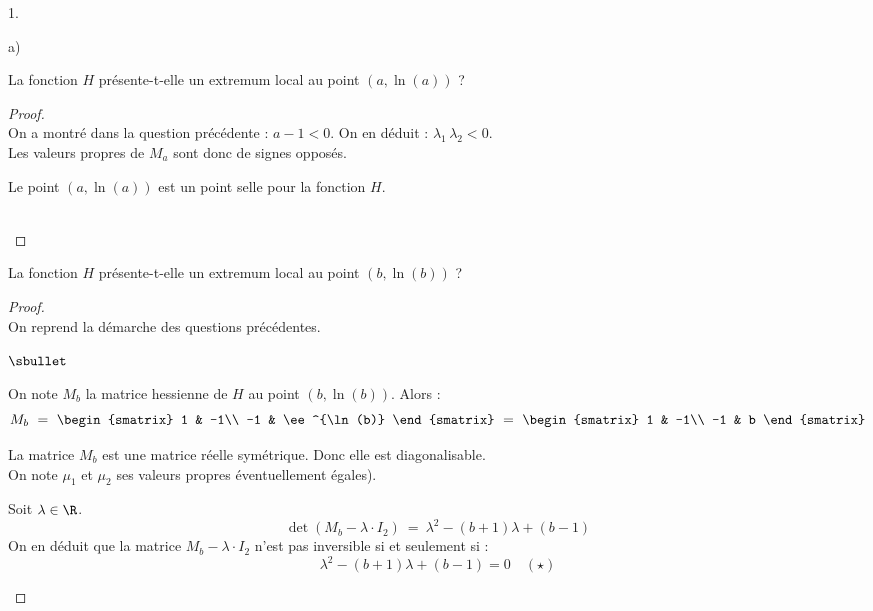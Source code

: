 \documentclass[11pt]{article}%
\begin{document}
\begin{noliste}{1.}
\begin{noliste}{a)}
    
    \item La fonction $H$ présente-t-elle un extremum local au point
    $(a,\ln(a))$ ?
    
    \begin{proof}~\\
      On a montré dans la question précédente : $a-1<0$. On en déduit : 
      $\lambda_1 \, \lambda_2 <0$.\\
      Les valeurs propres de $M_a$ sont donc de signes opposés.
      
      \begin{remark}
        Le point $(a,\ln(a))$ est un point selle pour la fonction $H$.
      \end{remark}~\\[-1.4cm]
    \end{proof}
  \end{noliste}
  
  
  \item La fonction $H$ présente-t-elle un extremum local au point 
  $(b,\ln(b))$ ?
  
  \begin{proof}~\\
    On reprend la démarche des questions précédentes.
    \begin{noliste}{$\sbullet$}
      \item On note $M_b$ la matrice hessienne de $H$ au point 
      $(b,\ln(b))$. Alors :
      \[
        M_b \ = \
        \begin{smatrix}
          1 & -1\\
          -1 & \ee^{\ln(b)}
        \end{smatrix}
        \ = \
        \begin{smatrix}
          1 & -1\\
          -1 & b
        \end{smatrix}
      \]
      
      \item La matrice $M_b$ est une matrice réelle symétrique. Donc 
      elle est diagonalisable.\\
      On note $\mu_1$ et $\mu_2$ ses valeurs propres éventuellement 
      égales).
      
      \item Soit $\lambda \in \R$.
      \[
        \det(M_b - \lambda \cdot I_2) \ = \ \lambda^2 - (b+1) \lambda 
        + (b-1)
      \]
      On en déduit que la matrice $M_b - \lambda \cdot I_2$ n'est pas 
      inversible si et seulement si :
      \[
        \lambda^2 - (b+1) \lambda + (b-1) = 0 \quad (\star)
      \]
      

\end{noliste}
\end{proof}
\end{noliste}
\end{document}
